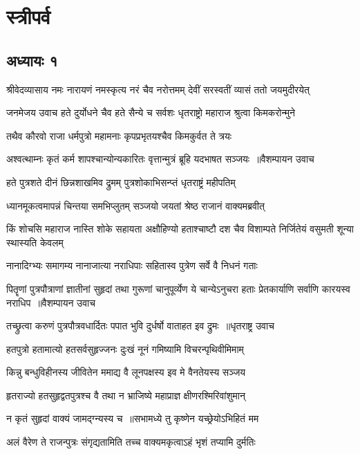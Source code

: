 \part{स्त्रीपर्व}
\chapter{अध्यायः १}
\threelineshloka
{श्रीवेदव्यासाय नमः}
{नारायणं नमस्कृत्य नरं चैव नरोत्तमम्}
{देवीं सरस्वतीं व्यासं ततो जयमुदीरयेत्}


\threelineshloka
{जनमेजय उवाच}
{हते दुर्योधने चैव हते सैन्ये च सर्वशः}
{धृतराष्ट्रो महाराज श्रुत्वा किमकरोन्मुने}


\twolineshloka
{तथैव कौरवो राजा धर्मपुत्रो महामनाः}
{कृपप्रभृतयश्चैव किमकुर्वत ते त्रयः}


\threelineshloka
{अश्वत्थाम्नः कृतं कर्म शापश्चान्योन्यकारितः}
{वृत्तान्मुत्रं ब्रूहि यदभाषत सञ्जयः ॥वैशम्पायन उवाच}
{}


\twolineshloka
{हते पुत्रशते दीनं छिन्नशाखमिव द्रुमम्}
{पुत्रशोकाभिसन्प्तं धृतराष्ट्रं महीपतिम्}


\twolineshloka
{ध्यानमूकत्वमापन्नं चिन्तया समभिप्लुतम्}
{सञ्जयो जयतां श्रेष्ठ राजानं वाक्यमब्रवीत्}


\threelineshloka
{किं शोचसि महाराज नास्ति शोके सहायता}
{अक्षौहिण्यो हताश्चाष्टौ दश चैव विशाम्पते}
{निर्जितेयं वसुमती शून्या स्थास्यति केवलम्}


\twolineshloka
{नानादिग्भ्यः समागम्य नानाजात्या नराधिपाः}
{सहितास्व पुत्रेण सर्वे वै निधनं गताः}


\fourlineindentedshloka
{पितॄणां पुत्रपौत्राणां ज्ञातीनां सुहृदां तथा}
{गुरूणां चानुपूर्व्येण ये चान्येऽनुचरा हताः}
{प्रेतकार्याणि सर्वाणि कारयस्व नराधिप ॥वैशम्पायन उवाच}
{}


\threelineshloka
{तच्छ्रुत्वा करुणं पुत्रपौत्रवधार्दितः}
{पपात भुवि दुर्धर्षो वाताहत इव द्रुमः ॥धृतराष्ट्र उवाच}
{}


\twolineshloka
{हतपुत्रो हतामात्यो हतसर्वसुहृज्जनः}
{दुःखं नूनं गमिष्यामि विचरन्पृथिवीमिमाम्}


\twolineshloka
{किन्नु बन्धुविहीनस्य जीवितेन ममाद्य वै}
{लूनपक्षस्य इव मे वैनतेयस्य सञ्जय}


\twolineshloka
{हृतराज्यो हतसुहृद्वतपुत्रश्च वै तथा}
{न भ्राजिष्ये महाप्राज्ञ क्षीणरश्मिरिवांशुमान्}


\twolineshloka
{न कृतं सुहृदां वाक्यं जामद्ग्न्यस्य च ॥सभामध्ये तु कृष्णेन यच्छ्रेयोऽभिहितं मम}
{}


\twolineshloka
{अलं वैरेण ते राजन्पुत्रः संगृद्यतामिति}
{तच्च वाक्यमकृत्वाऽहं भृशं तप्यामि दुर्मतिः}


